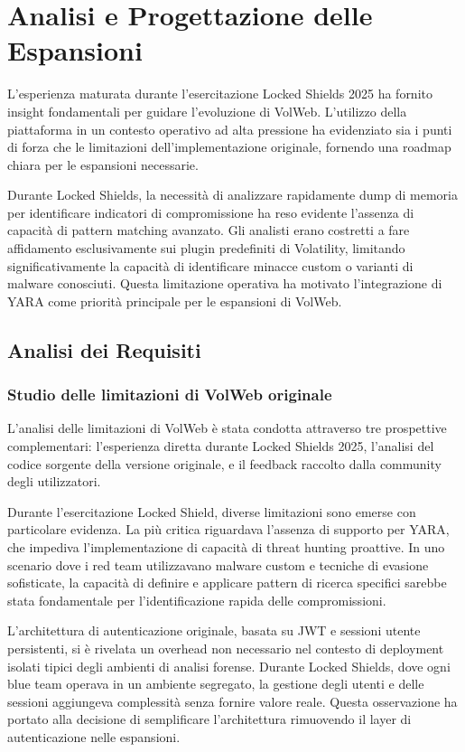 \chapter{Analisi e Progettazione delle Espansioni}

L'esperienza maturata durante l'esercitazione Locked Shields 2025 ha fornito insight fondamentali per guidare l'evoluzione di VolWeb. L'utilizzo della piattaforma in un contesto operativo ad alta pressione ha evidenziato sia i punti di forza che le limitazioni dell'implementazione originale, fornendo una roadmap chiara per le espansioni necessarie.

Durante Locked Shields, la necessità di analizzare rapidamente dump di memoria per identificare indicatori di compromissione ha reso evidente l'assenza di capacità di pattern matching avanzato. Gli analisti erano costretti a fare affidamento esclusivamente sui plugin predefiniti di Volatility, limitando significativamente la capacità di identificare minacce custom o varianti di malware conosciuti. Questa limitazione operativa ha motivato l'integrazione di YARA come priorità principale per le espansioni di VolWeb.

\section{Analisi dei Requisiti}

\subsection{Studio delle limitazioni di VolWeb originale}

L'analisi delle limitazioni di VolWeb è stata condotta attraverso tre prospettive complementari: l'esperienza diretta durante Locked Shields 2025, l'analisi del codice sorgente della versione originale, e il feedback raccolto dalla community degli utilizzatori.

Durante l'esercitazione Locked Shield, diverse limitazioni sono emerse con particolare evidenza. La più critica riguardava l'assenza di supporto per YARA, che impediva l'implementazione di capacità di threat hunting proattive. In uno scenario dove i red team utilizzavano malware custom e tecniche di evasione sofisticate, la capacità di definire e applicare pattern di ricerca specifici sarebbe stata fondamentale per l'identificazione rapida delle compromissioni.

L'architettura di autenticazione originale, basata su JWT e sessioni utente persistenti, si è rivelata un overhead non necessario nel contesto di deployment isolati tipici degli ambienti di analisi forense. Durante Locked Shields, dove ogni blue team operava in un ambiente segregato, la gestione degli utenti e delle sessioni aggiungeva complessità senza fornire valore reale. Questa osservazione ha portato alla decisione di semplificare l'architettura rimuovendo il layer di autenticazione nelle espansioni.

